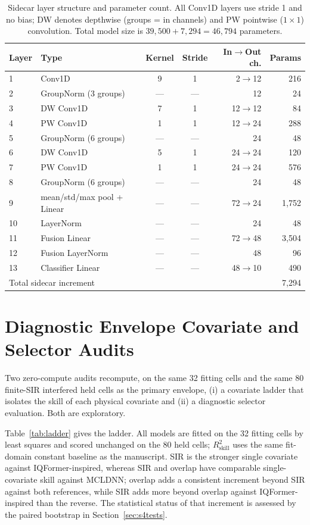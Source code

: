 \documentclass[letterpaper,onecolumn,11pt,journal]{IEEEtran}
\begin{document}
\begin{table}[t]
\centering
\caption{Sidecar layer structure and parameter count. All Conv1D layers use
stride 1 and no bias; DW denotes depthwise (groups = in channels) and PW
pointwise ($1\times1$) convolution. Total model size is $39{,}500+7{,}294=
46{,}794$ parameters.}
\label{tab:sidecar}
\footnotesize
\setlength{\tabcolsep}{4pt}
\begin{tabular}{llccrr}
\toprule
Layer & Type & Kernel & Stride & In$\to$Out ch. & Params\\
\midrule
1 & Conv1D & 9 & 1 & 2$\to$12 & 216\\
2 & GroupNorm (3 groups) & --- & --- & 12 & 24\\
3 & DW Conv1D & 7 & 1 & 12$\to$12 & 84\\
4 & PW Conv1D & 1 & 1 & 12$\to$24 & 288\\
5 & GroupNorm (6 groups) & --- & --- & 24 & 48\\
6 & DW Conv1D & 5 & 1 & 24$\to$24 & 120\\
7 & PW Conv1D & 1 & 1 & 24$\to$24 & 576\\
8 & GroupNorm (6 groups) & --- & --- & 24 & 48\\
9 & mean/std/max pool + Linear & --- & --- & 72$\to$24 & 1{,}752\\
10 & LayerNorm & --- & --- & 24 & 48\\
11 & Fusion Linear & --- & --- & 72$\to$48 & 3{,}504\\
12 & Fusion LayerNorm & --- & --- & 48 & 96\\
13 & Classifier Linear & --- & --- & 48$\to$10 & 490\\
\midrule
\multicolumn{5}{l}{Total sidecar increment} & 7{,}294\\
\bottomrule
\end{tabular}
\end{table}

\section{Diagnostic Envelope Covariate and Selector Audits}
Two zero-compute audits recompute, on the same 32 fitting cells and the same
80 finite-SIR interfered held cells as the primary envelope, (i) a covariate
ladder that isolates the skill of each physical covariate and (ii) a
diagnostic selector evaluation. Both are exploratory.

Table~\ref{tab:ladder} gives the ladder. All models are fitted on the 32
fitting cells by least squares and scored unchanged on the 80 held cells;
$R^2_{\mathrm{skill}}$ uses the same fit-domain constant baseline as the
manuscript. SIR is the stronger single covariate against IQFormer-inspired,
whereas SIR and overlap have comparable single-covariate skill against
MCLDNN; overlap adds a consistent increment beyond SIR against both
references, while SIR adds more beyond overlap against IQFormer-inspired
than the reverse. The statistical status of that increment is assessed by the
paired bootstrap in Section~\ref{sec:s4tests}.
\end{document}
